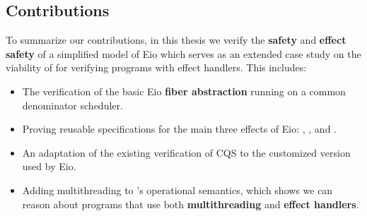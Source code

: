\subsection{Contributions}
\label{sec:intro-contributions}

To summarize our contributions, in this thesis we verify the \textbf{safety} and \textbf{effect safety} of a simplified model of Eio which serves as an extended case study on the viability of \hazel{} for verifying programs with effect handlers.
This includes:

\begin{itemize}
    \item The verification of the basic Eio \textbf{fiber abstraction} running on a common denominator scheduler.
    \item Proving reusable specifications for the main three effects of Eio: \efork{}, \esuspend{}, and \egetctx{}.
    \item An adaptation of the existing verification of CQS to the customized version used by Eio.
    \item Adding multithreading to \hazel{}'s operational semantics, which shows we can reason about programs that use both \textbf{multithreading} and \textbf{effect handlers}.
\end{itemize}
